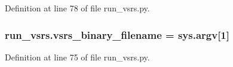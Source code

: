 Definition at line 78 of file run\+\_\+vsrs.\+py.

\subsubsection[{\texorpdfstring{vsrs\+\_\+binary\+\_\+filename}{vsrs_binary_filename}}]{\setlength{\rightskip}{0pt plus 5cm}run\+\_\+vsrs.\+vsrs\+\_\+binary\+\_\+filename = sys.\+argv\mbox{[}1\mbox{]}}\hypertarget{namespacerun__vsrs_adf3ba948a5f8384031e8473a315dd950}{}\label{namespacerun__vsrs_adf3ba948a5f8384031e8473a315dd950}


Definition at line 75 of file run\+\_\+vsrs.\+py.

